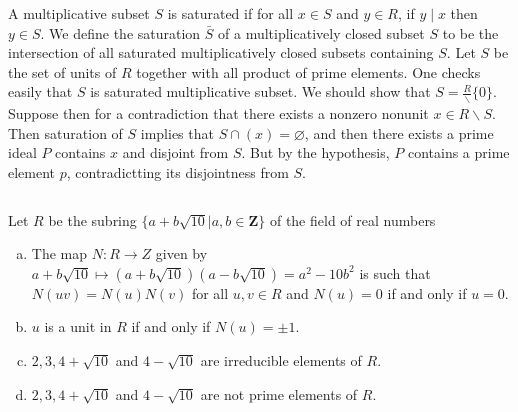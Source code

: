 \begin{answer}
    A multiplicative subset $S$ is saturated if for all $x\in S$ and $y\in R$, if $y\mid x$ then $y\in S$. We define the saturation $\bar{S}$ of a multiplicatively closed subset $S$ to be the intersection of all saturated multiplicatively closed subsets containing $S$. Let  $S$ be the set of units of $R$ together with all product of prime elements. One checks easily that $S$ is saturated multiplicative subset. We should show that $S=\frac{R} \backslash\{0\}$. Suppose then for a contradiction that there exists a nonzero nonunit $x\in R\backslash S$. Then saturation of $S$ implies that $S\cap (x)=\varnothing$, and then there exists a prime ideal $P$ contains $x$ and disjoint from $S$. But by the hypothesis, $P$ contains a prime element $p$, contradictting its disjointness from $S$.
\end{answer}

$$ $$

\begin{ex}
    Let $R$ be the subring $\{a+b\sqrt{10}|a,b\in \mathbf{Z}\}$ of the field of real numbers
    \begin{enumerate}[(a)]
        \item The map $N:R\to Z$ given by $a+b\sqrt{10}\mapsto (a+b\sqrt{10})(a-b\sqrt{10})=a^{2}-10b^{2}$ is such that $N(uv)=N(u)N(v)$ for all $u,v\in R$ and $N(u)=0$ if and only if $u=0$.
        \item $u$ is a unit in $R$ if and only if $N(u)=\pm 1$.
        \item $2,3,4+\sqrt{10}$ and $4-\sqrt{10}$ are irreducible elements of $R$.
        \item $2,3,4+\sqrt{10}$ and $4-\sqrt{10}$ are not prime elements of $R$.
    \end{enumerate}
\end{ex}


